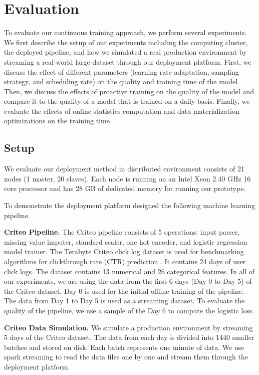 \section{Evaluation} \label{evaluation} 
To evaluate our continuous training approach, we perform several experiments.
We first describe the setup of our experiments including the computing cluster, the deployed pipeline, and how we simulated a real production environment by streaming a real-world large dataset through our deployment platform.
First, we discuss the effect of different parameters (learning rate adaptation, sampling strategy, and scheduling rate) on the quality and training time of the model.
Then, we discuss the effects of proactive training on the quality of the model and compare it to the quality of a model that is trained on a daily basis.
Finally, we evaluate the effects of online statistics computation and data materialization optimizations on the training time.

\subsection{Setup}\label{subsec:setup}
We evaluate our deployment method in distributed environment consists of 21 nodes (1 master, 20 slaves).
Each node is running on an Intel Xeon 2.40 GHz 16 core processor and has 28 GB of dedicated memory for running our prototype.

To demonstrate the deployment platform designed the following machine learning pipeline.

\textbf{Criteo Pipeline.} 
The Criteo pipeline consists of 5 operations: input parser, missing value imputer, standard scaler, one hot encoder, and logistic regression model trainer. 
The Terabyte Criteo click log dataset is used for benchmarking algorithms for clickthrough rate (CTR) prediction \cite{criteo-log}.
It contains 24 days of user click logs. 
The dataset contains 13 numerical and 26 categorical features. 
In all of our experiments, we are using the data from the first 6 days (Day 0 to Day 5) of the Criteo dataset.
Day 0 is used for the initial offline training of the pipeline.
The data from Day 1 to Day 5 is used as a streaming dataset.
To evaluate the quality of the pipeline, we use a sample of the Day 6 to compute the logistic loss.

\textbf{Criteo Data Simulation.}
We simulate a production environment by streaming 5 days of the Criteo dataset.
The data from each day is divided into 1440 smaller batches and stored on disk.
Each batch represents one minute of data.
We use spark streaming to read the data files one by one and stream them through the deployment platform. 


